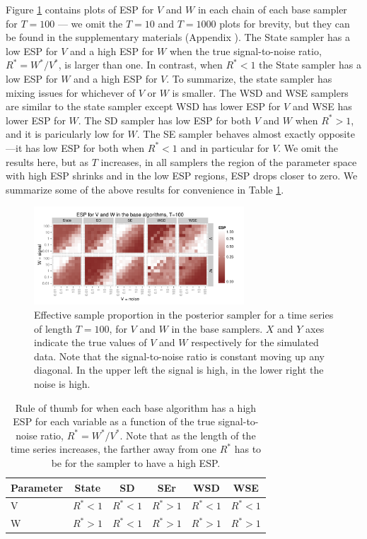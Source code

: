 \documentclass[12pt]{article}
\begin{document}
Figure \ref{baseESplot} contains plots of ESP for $V$ and $W$ in each chain of each base sampler for $T=100$ --- we omit the $T=10$ and $T=1000$ plots for brevity, but they can be found in the supplementary materials (Appendix ). The State sampler has a low ESP for $V$ and a high ESP for $W$ when the true signal-to-noise ratio, $R^*=W^*/V^*$, is larger than one. In contrast, when $R^*<1$ the State sampler has a low ESP for $W$ and a high ESP for $V$. To summarize, the state sampler has mixing issues for whichever of $V$ or $W$ is smaller. The WSD and WSE samplers are similar to the state sampler except WSD has lower ESP for $V$ and WSE has lower ESP for $W$. The SD sampler has low ESP for both $V$ and $W$ when $R^*>1$, and it is paricularly low for $W$. The SE sampler behaves almost exactly opposite ---it has low ESP for both when $R^*<1$ and in particular for $V$. We omit the results here, but as $T$ increases, in all samplers the region of the parameter space with high ESP shrinks and in the low ESP regions, ESP drops closer to zero. We summarize some of the above results for convenience in Table \ref{tab:stnmix}.

\begin{figure}[!h]
\centering
\includegraphics[width=0.7\textwidth]{baseESplot100}
\caption{Effective sample proportion in the posterior sampler for a time series of length $T=100$, for $V$ and $W$ in the base samplers. $X$ and $Y$ axes indicate the true values of $V$ and $W$ respectively for the simulated data. Note that the signal-to-noise ratio is constant moving up any diagonal. In the upper left the signal is high, in the lower right the noise is high.}
\label{baseESplot}
\end{figure}

\begin{table}
  \centering
  \begin{tabular}{|l|ccccc|}\hline
    Parameter & State & SD & SEr & WSD & WSE \\\hline
    V & $R^* < 1$ & $R^* < 1$ & $R^* > 1$ & $R^* < 1$ & $R^* < 1$\\
    W & $R^* > 1$ & $R^* < 1$ & $R^* > 1$ & $R^* > 1$ & $R^* > 1$ \\\hline
  \end{tabular}
  \caption{Rule of thumb for when each base algorithm has a high ESP for each variable as a function of the true signal-to-noise ratio, $R^*=W^*/V^*$. Note that as the length of the time series increases, the farther away from one $R^*$ has to be for the sampler to have a high ESP.}
  \label{tab:stnmix}
\end{table}
\end{document}
